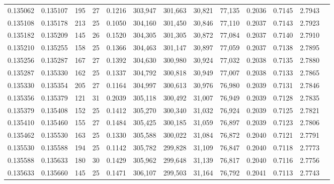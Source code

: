 \begin{tabular}{rrrrrrrrrrrrr}
0.135062 & 0.135107 & 195 &  27 &                                     0.1216 & 303,947 & 301,663 &  30,821 &  77,135 & 0.2036 & 0.7145 & 2.7943 \\
0.135108 & 0.135178 & 213 &  25 &                                     0.1050 & 304,160 & 301,450 &  30,846 &  77,110 & 0.2037 & 0.7143 & 2.7923 \\
0.135182 & 0.135209 & 145 &  26 &                                     0.1520 & 304,305 & 301,305 &  30,872 &  77,084 & 0.2037 & 0.7140 & 2.7910 \\
0.135210 & 0.135255 & 158 &  25 &                                     0.1366 & 304,463 & 301,147 &  30,897 &  77,059 & 0.2037 & 0.7138 & 2.7895 \\
0.135256 & 0.135287 & 167 &  27 &                                     0.1392 & 304,630 & 300,980 &  30,924 &  77,032 & 0.2038 & 0.7135 & 2.7880 \\
0.135287 & 0.135330 & 162 &  25 &                                     0.1337 & 304,792 & 300,818 &  30,949 &  77,007 & 0.2038 & 0.7133 & 2.7865 \\
0.135330 & 0.135354 & 205 &  27 &                                     0.1164 & 304,997 & 300,613 &  30,976 &  76,980 & 0.2039 & 0.7131 & 2.7846 \\
0.135356 & 0.135379 & 121 &  31 &                                     0.2039 & 305,118 & 300,492 &  31,007 &  76,949 & 0.2039 & 0.7128 & 2.7835 \\
0.135379 & 0.135408 & 152 &  25 &                                     0.1412 & 305,270 & 300,340 &  31,032 &  76,924 & 0.2039 & 0.7125 & 2.7821 \\
0.135410 & 0.135460 & 155 &  27 &                                     0.1484 & 305,425 & 300,185 &  31,059 &  76,897 & 0.2039 & 0.7123 & 2.7806 \\
0.135462 & 0.135530 & 163 &  25 &                                     0.1330 & 305,588 & 300,022 &  31,084 &  76,872 & 0.2040 & 0.7121 & 2.7791 \\
0.135530 & 0.135588 & 194 &  25 &                                     0.1142 & 305,782 & 299,828 &  31,109 &  76,847 & 0.2040 & 0.7118 & 2.7773 \\
0.135588 & 0.135633 & 180 &  30 &                                     0.1429 & 305,962 & 299,648 &  31,139 &  76,817 & 0.2040 & 0.7116 & 2.7756 \\
0.135633 & 0.135660 & 145 &  25 &                                     0.1471 & 306,107 & 299,503 &  31,164 &  76,792 & 0.2041 & 0.7113 & 2.7743 \\

\end{tabular}
